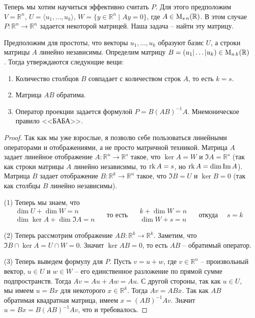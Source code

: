 Теперь мы хотим научиться эффективно считать $P$.
Для этого предположим $V = \mathbb R^n$, $U = \langle u_1,\ldots,u_k\rangle$, $W = \{y\in \mathbb R^n\mid Ay = 0\}$, где $A\in \operatorname{M}_{s\,n}(\mathbb R)$.
В этом случае $P\colon \mathbb R^n\to \mathbb R^n$ задается некоторой матрицей.
Наша задача -- найти эту матрицу.

Предположим для простоты, что векторы $u_1,\ldots,u_k$ образуют базис $U$, а строки матрицы $A$ линейно независимы.
Определим матрицу $B = (u_1|\ldots|u_k)\in \operatorname{M}_{n\,k}(\mathbb R)$.
Тогда утверждаются следующие вещи:
\begin{enumerate}
\item Количество столбцов $B$ совпадает с количеством строк $A$, то есть $k = s$.

\item Матрица $AB$ обратима.

\item Оператор проекции задается формулой $P = B(AB)^{-1}A$.
Мнемоническое правило <<БАБА>>.
\end{enumerate}
\begin{proof}
Так как мы уже взрослые, я позволю себе пользоваться линейными операторами и отображениями, а не просто матричной техникой.
Матрица $A$ задает линейное отображение $A\colon \mathbb R^n \to \mathbb R^s$ такое, что $\ker A = W$ и $\Im A = \mathbb R^s$ (так как строки матрицы $A$ линейно независимы, то $\operatorname{rk} A = s$, но $\operatorname{rk} A = \dim \operatorname{Im} A$).
Матрица $B$ задает отображение $B\colon \mathbb R^k \to \mathbb R^n$ такое, что $\Im B = U$ и $\ker B = 0$ (так как столбцы $B$ линейно независимы).

(1) Теперь мы знаем, что 
\[
\begin{aligned}
\dim U + \dim W = n\\
\dim \ker A + \dim \Im A = n
\end{aligned}
\quad\text{ то есть }\quad
\begin{aligned}
k + \dim W = n\\
\dim W+ s= n
\end{aligned}
\quad\text{ откуда }\quad
s = k
\]

(2) Теперь рассмотрим отображение $AB\colon \mathbb R^k \to \mathbb R^k$.
Заметим, что $\Im B \cap \ker A = U \cap W = 0$.
Значит $\ker AB = 0$, то есть $AB$ -- обратимый оператор.

(3) Теперь выведем формулу для $P$.
Пусть $v = u + w$, где $v\in \mathbb R^n$ -- произвольный вектор, $u\in U$ и $w\in W$ -- его единственное разложение по прямой сумме подпространств.
Тогда $Av = Au + Aw = Au$.
С другой стороны, так как $u\in U$, мы имеем $u = B x$ для некоторого $x\in \mathbb R^k$.
Тогда $Av = ABx$.
Так как $AB$ обратимая квадратная матрица, имеем $x = (AB)^{-1}Av$.
Значит $u = Bx = B(AB)^{-1}Av$, что и требовалось.
\end{proof}

